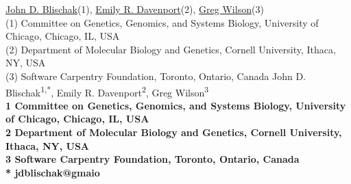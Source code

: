 

\iflatexml
  \href{https://www.authorea.com/users/5990}{John D. Blischak}(1), \href{https://www.authorea.com/users/16152}{Emily R. Davenport}(2), \href{https://www.authorea.com/users/18131}{Greg Wilson}(3)\\

  (1) Committee on Genetics, Genomics, and Systems Biology, University of Chicago, Chicago, IL, USA\\
  (2) Department of Molecular Biology and Genetics, Cornell University, Ithaca, NY, USA\\
  (3) Software Carpentry Foundation, Toronto, Ontario, Canada
\else
  John D. Blischak\textsuperscript{1,*},
  Emily R. Davenport\textsuperscript{2},
  Greg Wilson\textsuperscript{3}
  \\
  \bigskip
  \bf{1} Committee on Genetics, Genomics, and Systems Biology, University of Chicago, Chicago, IL, USA
  \\
  \bf{2} Department of Molecular Biology and Genetics, Cornell University, Ithaca, NY, USA
  \\
  \bf{3} Software Carpentry Foundation, Toronto, Ontario, Canada
  \\
  \bigskip
  * jdblischak@gmaio
